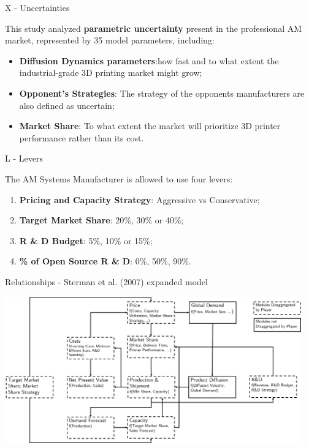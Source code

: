 \documentclass[12pt,ignorenonframetext,]{beamer}
\providecommand{\tightlist}{%
  \setlength{\itemsep}{0pt}\setlength{\parskip}{0pt}}
\begin{document}
\begin{frame}{X - Uncertainties}
\protect\hypertarget{x---uncertainties}{}

This study analyzed \textbf{parametric uncertainty} present in the
professional AM market, represented by 35 model parameters, including:

\begin{itemize}
\tightlist
\item
  \textbf{Diffusion Dynamics parameters}:how fast and to what extent the
  industrial-grade 3D printing market might grow;
\item
  \textbf{Opponent's Strategies}: The strategy of the opponents
  manufacturers are also defined as uncertain;
\item
  \textbf{Market Share}: To what extent the market will prioritize 3D
  printer performance rather than its cost.
\end{itemize}

\end{frame}

\begin{frame}{L - Levers}
\protect\hypertarget{l---levers}{}

The AM Systems Manufacturer is allowed to use four levers:

\begin{enumerate}
\tightlist
\item
  \textbf{Pricing and Capacity Strategy}: Aggressive vs Conservative;
\item
  \textbf{Target Market Share}: 20\%, 30\% or 40\%;
\item
  \textbf{R \& D Budget}: 5\%, 10\% or 15\%;
\item
  \textbf{\% of Open Source R \& D}: 0\%, 50\%, 90\%.
\end{enumerate}

\end{frame}

\begin{frame}{Relationships - Sterman et al. (2007) expanded model}
\protect\hypertarget{relationships---sterman-et-al.-2007-expanded-model}{}

\centerline{\includegraphics[height=2.5in]{images/model-boundaries.png}}

\end{frame}
\end{document}
